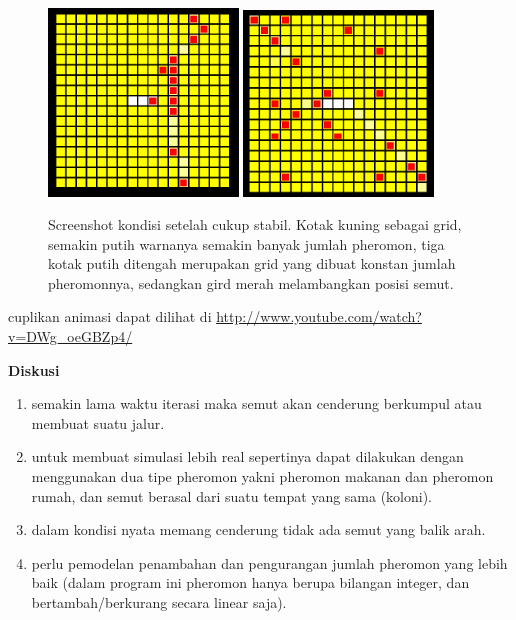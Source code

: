 \documentclass[paper=a4, fontsize=11pt]{scrartcl}
\numberwithin{equation}{section} %
\numberwithin{figure}{section} %
\numberwithin{table}{section} %
\begin{document}
\begin{figure}
	\centering
	\includegraphics[width=0.45\textwidth]{semut5.png}
	\includegraphics[width=0.45\textwidth]{semut6.png}
	\caption{Screenshot kondisi setelah cukup stabil. Kotak kuning sebagai grid, semakin putih warnanya semakin banyak jumlah pheromon, tiga kotak putih ditengah merupakan grid yang dibuat konstan jumlah pheromonnya, sedangkan gird merah melambangkan posisi semut.}
\end{figure}

cuplikan animasi dapat dilihat di \url{http://www.youtube.com/watch?v=DWg_oeGBZp4/}

\vspace{1cm}
\textbf{Diskusi}
\begin{enumerate}
\item semakin lama waktu iterasi maka semut akan cenderung berkumpul atau membuat suatu jalur.
\item untuk membuat simulasi lebih real sepertinya dapat dilakukan dengan menggunakan dua tipe pheromon yakni pheromon makanan dan pheromon rumah, dan semut berasal dari suatu tempat yang sama (koloni).
\item dalam kondisi nyata memang cenderung tidak ada semut yang balik arah.
\item perlu pemodelan penambahan dan pengurangan jumlah pheromon yang lebih baik (dalam program ini pheromon hanya berupa bilangan integer, dan bertambah/berkurang secara linear saja). 
\end{enumerate}
\end{document}
